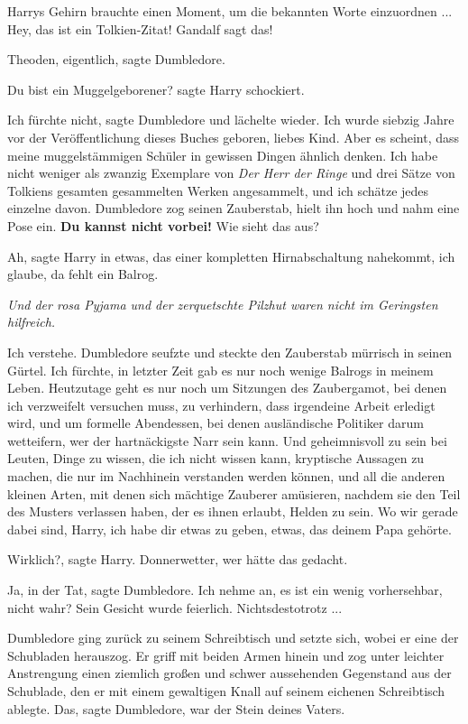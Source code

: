 Harrys Gehirn brauchte einen Moment, um die bekannten Worte einzuordnen ... \glqq{}
Hey, das ist ein Tolkien-Zitat! Gandalf sagt das!\grqq{}

\glqq{}Theoden, eigentlich\grqq{}, sagte Dumbledore.

\glqq{}Du bist ein Muggelgeborener?\grqq{} sagte Harry schockiert.

\glqq{}Ich fürchte nicht\grqq{}, sagte Dumbledore und lächelte wieder. \glqq{}Ich
wurde siebzig Jahre vor der Veröffentlichung dieses Buches geboren, liebes Kind.
Aber es scheint, dass meine muggelstämmigen Schüler in gewissen Dingen ähnlich
denken. Ich habe nicht weniger als zwanzig Exemplare von \emph{Der Herr der
Ringe} und drei Sätze von Tolkiens gesamten gesammelten Werken angesammelt, und
ich schätze jedes einzelne davon.\grqq{} Dumbledore zog seinen Zauberstab, hielt
ihn hoch und nahm eine Pose ein. \glqq{}\textbf{Du kannst nicht vorbei!} Wie
sieht das aus?\grqq{}

\glqq{}Ah\grqq{}, sagte Harry in etwas, das einer kompletten Hirnabschaltung
nahekommt, \glqq{}ich glaube, da fehlt ein Balrog.\grqq{}

\emph{Und der rosa Pyjama und der zerquetschte Pilzhut waren nicht im Geringsten
hilfreich.}

\glqq{}Ich verstehe.\grqq{} Dumbledore seufzte und steckte den Zauberstab
mürrisch in seinen Gürtel. \glqq{}Ich fürchte, in letzter Zeit gab es nur noch
wenige Balrogs in meinem Leben. Heutzutage geht es nur noch um Sitzungen des
Zaubergamot, bei denen ich verzweifelt versuchen muss, zu verhindern, dass
irgendeine Arbeit erledigt wird, und um formelle Abendessen, bei denen
ausländische Politiker darum wetteifern, wer der hartnäckigste Narr sein kann.
Und geheimnisvoll zu sein bei Leuten, Dinge zu wissen, die ich nicht wissen
kann, kryptische Aussagen zu machen, die nur im Nachhinein verstanden werden
können, und all die anderen kleinen Arten, mit denen sich mächtige Zauberer
amüsieren, nachdem sie den Teil des Musters verlassen haben, der es ihnen
erlaubt, Helden zu sein. Wo wir gerade dabei sind, Harry, ich habe dir etwas zu
geben, etwas, das deinem Papa gehörte.\grqq{}

\glqq{}Wirklich?\grqq{}, sagte Harry. \glqq{}Donnerwetter, wer hätte das
gedacht.\grqq{}

\glqq{}Ja, in der Tat\grqq{}, sagte Dumbledore. \glqq{}Ich nehme an, es ist ein
wenig vorhersehbar, nicht wahr?\grqq{} Sein Gesicht wurde feierlich. \glqq{}
Nichtsdestotrotz ...\grqq{}

Dumbledore ging zurück zu seinem Schreibtisch und setzte sich, wobei er eine der
Schubladen herauszog. Er griff mit beiden Armen hinein und zog unter leichter
Anstrengung einen ziemlich großen und schwer aussehenden Gegenstand aus der
Schublade, den er mit einem gewaltigen Knall auf seinem eichenen Schreibtisch
ablegte. \glqq{}Das\grqq{}, sagte Dumbledore, \glqq{}war der Stein deines
Vaters.\grqq{}

